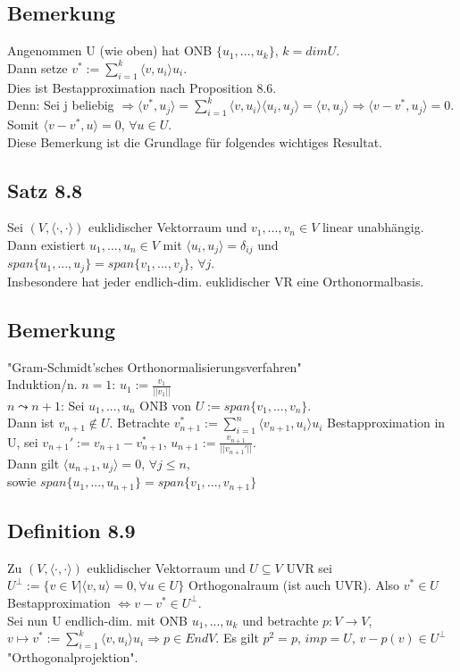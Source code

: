 \documentclass[a4paper, 12pt]{extarticle}
\newcommand{\skalar}[2] {
	\langle #1, #2\rangle
}
\newcommand{\genskalar}{
	\skalar{\cdot }{\cdot }
}
\begin{document}
\subsection*{Bemerkung}
Angenommen U (wie oben) hat ONB $\{u_1,...,u_k\}$, $k = dim U$. \\
Dann setze $v^*:= \sum_{i=1}^k\skalar{v}{u_i}u_i$. \\
Dies ist Bestapproximation nach Proposition 8.6. \\
Denn: Sei j beliebig $\Rightarrow \skalar{v^*}{u_j} = \sum_{i=1}^k\skalar{v}{u_i}\skalar{u_i}{u_j} = \skalar{v}{u_j} \Rightarrow \skalar{v-v^*}{u_j} = 0$.
Somit $\skalar{v-v^*}{u} = 0$, $\forall u \in U$. \\
Diese Bemerkung ist die Grundlage für folgendes wichtiges Resultat.
\subsection*{Satz 8.8}
Sei $(V, \genskalar)$ euklidischer Vektorraum und $v_1,..., v_n \in V$ linear unabhängig. Dann existiert $u_1,...,u_n \in V$ mit $\skalar{u_i}{u_j} = \delta_{ij}$ und $span \{u_1,...,u_j\} = span \{v_1,..., v_j\}$, $\forall j$. \\
Insbesondere hat jeder endlich-dim. euklidischer VR eine Orthonormalbasis.
\subsection*{Bemerkung}
"Gram-Schmidt'sches Orthonormalisierungsverfahren" \\
Induktion/n. $n=1$: $u_1 := \frac{v_1}{||v_1||}$ \\
$n \leadsto n+1$: Sei $u_1,..., u_n$ ONB von $U:=span\{v_1,...,v_n\}$. \\
Dann ist $v_{n+1} \notin U$. Betrachte $v^*_{n+1} := \sum_{i=1}^n \skalar{v_{n+1}}{u_i}u_i$ Bestapproximation in U, sei $v_{n+1}' := v_{n+1} - v^*_{n+1}$, $u_{n+1} := \frac{v_{n+1}}{||v_{n+1}'||}$. \\
Dann gilt $\skalar{u_{n+1}}{u_j} = 0$, $\forall j \leq n$, \\
sowie $span \{u_1,...,u_{n+1}\} = span \{v_1,...,v_{n+1}\}$
\subsection*{Definition 8.9}
Zu  $(V, \genskalar)$ euklidischer Vektorraum und $U \subseteq V$ UVR sei $U^\perp := \{v\in V| \skalar{v}{u}=0, \forall u\in U\}$ Orthogonalraum (ist auch UVR). Also $v^*\in U$ Bestapproximation $\Leftrightarrow v-v^* \in U^\perp$. \\
Sei nun U endlich-dim. mit ONB $u_1,...,u_k$ und betrachte $p:V\to V$, $v \mapsto v^*:= \sum_{i=1}^k\skalar{v}{u_i}u_i \Rightarrow p\in EndV$. Es gilt $p^2=p$, $imp = U$, $v-p(v)\in U^\perp$ "Orthogonalprojektion".
\end{document}
